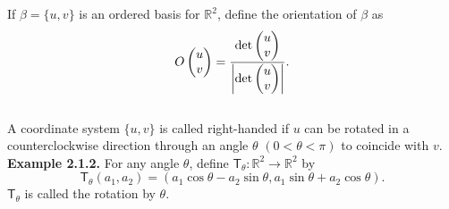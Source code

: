 \documentclass{article}
\begin{document}
If $\beta = \{ u, v \}$ is an ordered basis for $\mathbb{R}^2$,
define the orientation of $\beta$ as
$$O\begin{pmatrix} u \\ v \end{pmatrix}
= \frac
{\det\begin{pmatrix} u \\ v \end{pmatrix}}
{\abs{\det\begin{pmatrix} u \\ v \end{pmatrix}}}.$$ \\

A coordinate system $\{ u, v \}$ is called right-handed if
$u$ can be rotated in a counterclockwise direction through an angle $\theta$
$(0 < \theta < \pi)$ to coincide with $v$. \\

\textbf{Example 2.1.2.}
For any angle $\theta$, define
$\mathsf{T}_{\theta}: \mathbb{R}^2 \to \mathbb{R}^2$ by
$$\mathsf{T}_{\theta}(a_1, a_2)
= (a_1 \cos\theta - a_2\sin\theta, a_1\sin\theta + a_2\cos\theta).$$
$\mathsf{T}_{\theta}$ is called the rotation by $\theta$.\\
\end{document}
